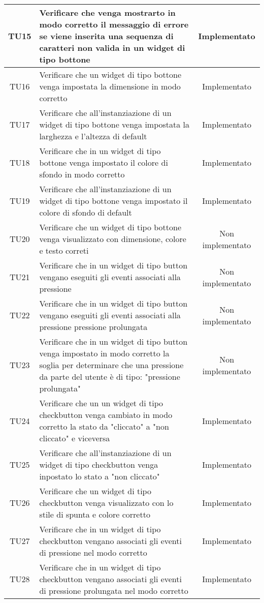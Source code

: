 \begin{center}
\begin{longtable}{|c|>{\centering}m{10cm}|c|}
		TU15 & Verificare che venga mostrarto in modo corretto il messaggio di errore se viene inserita una sequenza di caratteri non valida in un widget di tipo bottone & Implementato \\ \hline
		TU16 & Verificare che un widget di tipo bottone venga impostata la dimensione in modo corretto & Implementato \\ \hline
		TU17 & Verificare che all'instanziazione di un widget di tipo bottone venga impostata la larghezza e l'altezza di default & Implementato \\ \hline
		TU18 & Verificare che in un widget di tipo bottone venga impostato il colore di sfondo in modo corretto & Implementato \\ \hline
		TU19 & Verificare che all'instanziazione di un widget di tipo bottone venga impostato il colore di sfondo di default & Implementato \\ \hline
		TU20 & Verificare che un widget di tipo bottone venga visualizzato con dimensione, colore e testo correti & Non implementato \\ \hline
		TU21 & Verificare che in un widget di tipo button vengano eseguiti gli eventi associati alla pressione & Non implementato \\ \hline
		TU22 & Verificare che in un widget di tipo button vengano eseguiti gli eventi associati alla pressione pressione prolungata & Non implementato \\ \hline
		TU23 & Verificare che in un widget di tipo button venga impostato in modo corretto la soglia per determinare che una pressione da parte del utente è di tipo: "pressione prolungata" & Non implementato \\ \hline
		TU24 & Verificare che un un widget di tipo checkbutton venga cambiato in modo corretto la stato da "cliccato" a "non cliccato" e viceversa & Implementato \\ \hline
		TU25 & Verificare che all'instanziazione di un widget di tipo checkbutton venga inpostato lo stato a "non cliccato" & Implementato \\ \hline
		TU26 & Verificare che un widget di tipo checkbutton venga visualizzato con lo stile di spunta e colore corretto & Implementato \\ \hline
		TU27 & Verificare che in un widget di tipo checkbutton vengano associati gli eventi di pressione nel modo corretto & Implementato \\ \hline
		TU28 & Verificare che in un widget di tipo checkbutton vengano associati gli eventi di pressione prolungata nel modo corretto & Implementato \\ \hline

\end{longtable}
\end{center}
